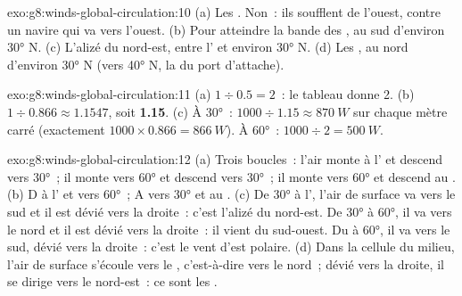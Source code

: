 \begin{solution}{exo:g8:winds-global-circulation:10}
(a) Les . Non~: ils soufflent de l'ouest, contre un navire
qui va vers l'ouest. (b) Pour atteindre la bande des , au sud
d'environ \ang{30} N. (c) L'alizé du nord-est, entre l' et environ
\ang{30} N. (d) Les , au nord d'environ \ang{30} N (vers
\ang{40} N, la  du port d'attache).
\end{solution}

\begin{solution}{exo:g8:winds-global-circulation:11}
(a) $1 \div 0.5 = 2$~: le tableau donne 2. (b) $1 \div 0.866 \approx
1.1547$, soit \textbf{1.15}. (c) À \ang{30}~: $1000 \div 1.15 \approx
\qty{870}{W}$ sur chaque mètre carré (exactement $1000 \times 0.866 =
\qty{866}{W}$). À \ang{60}~: $1000 \div 2 = \qty{500}{W}$.
\end{solution}

\begin{solution}{exo:g8:winds-global-circulation:12}
(a) Trois boucles~: l'air monte à l' et descend vers \ang{30}~; il
monte vers \ang{60} et descend vers \ang{30}~; il monte vers \ang{60} et
descend au . (b) D à l' et vers \ang{60}~; A vers \ang{30} et
au . (c) De \ang{30} à l', l'air de surface va vers le sud et
il est dévié vers la droite~: c'est l'alizé du nord-est. De \ang{30} à
\ang{60}, il va vers le nord et il est dévié vers la droite~: il vient du
sud-ouest. Du  à \ang{60}, il va vers le sud, dévié vers la droite~:
c'est le vent d'est polaire. (d) Dans la cellule du milieu, l'air de
surface s'écoule vers le , c'est-à-dire vers le nord~; dévié vers la
droite, il se dirige vers le nord-est~: ce sont les .
\end{solution}

